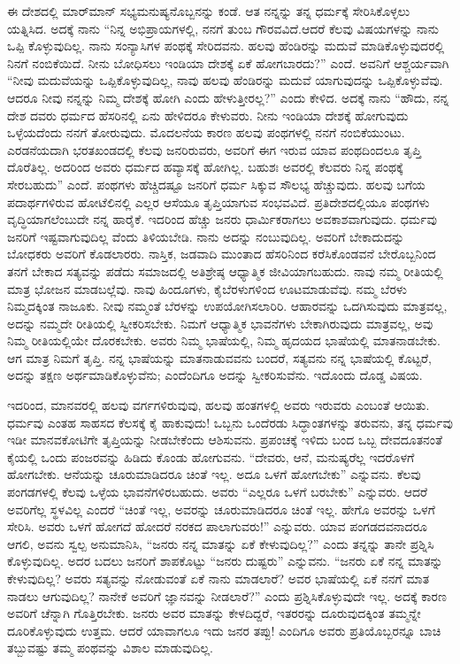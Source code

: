 ಈ ದೇಶದಲ್ಲಿ ಮಾರ್​ಮಾನ್​ ಸಭ್ಯಮನುಷ್ಯನೊಬ್ಬನನ್ನು ಕಂಡೆ. ಆತ ನನ್ನನ್ನು ತನ್ನ ಧರ್ಮಕ್ಕೆ ಸೇರಿಸಿಕೊಳ್ಳಲು ಯತ್ನಿಸಿದ. ಅದಕ್ಕೆ ನಾನು “ನಿನ್ನ ಅಭಿಪ್ರಾಯಗಳಲ್ಲಿ, ನನಗೆ ತುಂಬ ಗೌರವವಿದೆ.ಆದರೆ ಕೆಲವು ವಿಷಯಗಳನ್ನು ನಾನು ಒಪ್ಪಿ ಕೊಳ್ಳುವುದಿಲ್ಲ. ನಾನು ಸಂನ್ಯಾಸಿಗಳ ಪಂಥಕ್ಕೆ ಸೇರಿದವನು. ಹಲವು ಹೆಂಡಿರನ್ನು ಮದುವೆ ಮಾಡಿಕೊಳ್ಳುವುದರಲ್ಲಿ ನಿನಗೆ ನಂಬಿಕೆಯಿದೆ. ನೀನು ಬೋಧಿಸಲು ಇಂಡಿಯಾ ದೇಶಕ್ಕೆ ಏಕೆ ಹೋಗಬಾರದು?” ಎಂದೆ. ಅವನಿಗೆ ಆಶ್ಚರ್ಯವಾಗಿ “ನೀವು ಮದುವೆಯನ್ನು ಒಪ್ಪಿಕೊಳ್ಳುವುದಿಲ್ಲ, ನಾವು ಹಲವು ಹೆಂಡಿರನ್ನು ಮದುವೆ ಯಾಗುವುದನ್ನು ಒಪ್ಪಿಕೊಳ್ಳುವೆವು. ಆದರೂ ನೀವು ನನ್ನನ್ನು ನಿಮ್ಮ ದೇಶಕ್ಕೆ ಹೋಗಿ ಎಂದು ಹೇಳುತ್ತೀರಲ್ಲ?” ಎಂದು ಕೇಳಿದ. ಅದಕ್ಕೆ ನಾನು “ಹೌದು, ನನ್ನ ದೇಶ ದವರು ಧರ್ಮದ ಹೆಸರಿನಲ್ಲಿ ಏನು ಹೇಳಿದರೂ ಕೇಳುವರು. ನೀನು ಇಂಡಿಯಾ ದೇಶಕ್ಕೆ ಹೋಗುವುದು ಒಳ್ಳೆಯದೆಂದು ನನಗೆ ತೋರುವುದು. ಮೊದಲನೆಯ ಕಾರಣ ಹಲವು ಪಂಥಗಳಲ್ಲಿ ನನಗೆ ನಂಬಿಕೆಯುಂಟು. ಎರಡನೆಯದಾಗಿ ಭರತಖಂಡದಲ್ಲಿ ಕೆಲವು ಜನರಿರುವರು, ಅವರಿಗೆ ಈಗ ಇರುವ ಯಾವ ಪಂಥದಿಂದಲೂ ತೃಪ್ತಿ ದೊರೆತಿಲ್ಲ. ಅದರಿಂದ ಅವರು ಧರ್ಮದ ಹವ್ಯಾಸಕ್ಕೆ ಹೋಗಿಲ್ಲ. ಬಹುಶಃ ಅವರಲ್ಲಿ ಕೆಲವರು ನಿನ್ನ ಪಂಥಕ್ಕೆ ಸೇರಬಹುದು” ಎಂದೆ. ಪಂಥಗಳು ಹೆಚ್ಚಿದಷ್ಟೂ ಜನರಿಗೆ ಧರ್ಮ ಸಿಕ್ಕುವ ಸೌಲಭ್ಯ ಹೆಚ್ಚುವುದು. ಹಲವು ಬಗೆಯ ಪದಾರ್ಥಗಳಿರುವ ಹೋಟೆಲಿನಲ್ಲಿ ಎಲ್ಲರ ಆಸೆಯೂ ತೃಪ್ತಿಯಾಗುವ ಸಂಭವವಿದೆ. ಪ್ರತಿದೇಶದಲ್ಲಿಯೂ ಪಂಥಗಳು ವೃದ್ಧಿಯಾಗಲೆಂಬುದೇ ನನ್ನ ಹಾರೈಕೆ. ಇದರಿಂದ ಹೆಚ್ಚು ಜನರು ಧಾರ್ಮಿಕರಾಗಲು ಅವಕಾಶವಾಗುವುದು. ಧರ್ಮವು ಜನರಿಗೆ ಇಷ್ಟವಾಗುವುದಿಲ್ಲ ವೆಂದು ತಿಳಿಯಬೇಡಿ. ನಾನು ಅದನ್ನು ನಂಬುವುದಿಲ್ಲ. ಅವರಿಗೆ ಬೇಕಾದುದನ್ನು ಬೋಧಕರು ಅವರಿಗೆ ಕೊಡಲಾರರು. ನಾಸ್ತಿಕ, ಜಡವಾದಿ ಮುಂತಾದ ಹೆಸರಿನಿಂದ ಕರೆಸಿಕೊಂಡವನೆ ಬೇರೊಬ್ಬನಿಂದ ತನಗೆ ಬೇಕಾದ ಸತ್ಯವನ್ನು ಪಡೆದು ಸಮಾಜದಲ್ಲಿ ಅತಿಶ್ರೇಷ್ಠ ಆಧ್ಯಾತ್ಮಿಕ ಜೀವಿಯಾಗಬಹುದು. ನಾವು ನಮ್ಮ ರೀತಿಯಲ್ಲಿ ಮಾತ್ರ ಭೋಜನ ಮಾಡಬಲ್ಲೆವು. ನಾವು ಹಿಂದೂಗಳು, ಕೈಬೆರಳುಗಳಿಂದ ಊಟಮಾಡುವೆವು. ನಮ್ಮ ಬೆರಳು ನಿಮ್ಮದಕ್ಕಿಂತ ನಾಜೂಕು. ನೀವು ನಮ್ಮಂತೆ ಬೆರಳನ್ನು ಉಪಯೋಗಿಸಲಾರಿರಿ. ಆಹಾರವನ್ನು ಒದಗಿಸುವುದು ಮಾತ್ರವಲ್ಲ, ಅದನ್ನು ನಮ್ಮದೇ ರೀತಿಯಲ್ಲಿ ಸ್ವೀಕರಿಸಬೇಕು. ನಿಮಗೆ ಆಧ್ಯಾತ್ಮಿಕ ಭಾವನೆಗಳು ಬೇಕಾಗಿರುವುದು ಮಾತ್ರವಲ್ಲ, ಅವು ನಿಮ್ಮ ರೀತಿಯಲ್ಲಿಯೇ ದೊರಕಬೇಕು. ಅವರು ನಿಮ್ಮ ಭಾಷೆಯಲ್ಲಿ, ನಿಮ್ಮ ಹೃದಯದ ಭಾಷೆಯಲ್ಲಿ ಮಾತನಾಡಬೇಕು. ಆಗ ಮಾತ್ರ ನಿಮಗೆ ತೃಪ್ತಿ. ನನ್ನ ಭಾಷೆಯನ್ನು ಮಾತನಾಡುವವನು ಬಂದರೆ, ಸತ್ಯವನು ನನ್ನ ಭಾಷೆಯಲ್ಲಿ ಕೊಟ್ಟರೆ, ಅದನ್ನು ತಕ್ಷಣ ಅರ್ಥಮಾಡಿಕೊಳ್ಳುವೆನು; ಎಂದೆಂದಿಗೂ ಅದನ್ನು ಸ್ವೀಕರಿಸುವೆನು. ಇದೊಂದು ದೊಡ್ಡ ವಿಷಯ.

ಇದರಿಂದ, ಮಾನವರಲ್ಲಿ ಹಲವು ವರ್ಗಗಳಿರುವುವು, ಹಲವು ಹಂತಗಳಲ್ಲಿ ಅವರು ಇರುವರು ಎಂಬಂತೆ ಆಯಿತು. ಧರ್ಮವು ಎಂತಹ ಸಾಹಸದ ಕೆಲಸಕ್ಕೆ ಕೈ ಹಾಕುವುದು! ಒಬ್ಬನು ಒಂದೆರಡು ಸಿದ್ಧಾಂತಗಳನ್ನು ತರುವನು, ತನ್ನ ಧರ್ಮವು ಇಡೀ ಮಾನವಕೋಟಿಗೇ ತೃಪ್ತಿಯನ್ನು ನೀಡಬೇಕೆಂದು ಆಶಿಸುವನು. ಪ್ರಪಂಚಕ್ಕೆ ಇಳಿದು ಬಂದ ಒಬ್ಬ ದೇವದೂತನಂತೆ ಕೈಯಲ್ಲಿ ಒಂದು ಪಂಜರವನ್ನು ಹಿಡಿದು ಕೊಂಡು ಹೋಗುವನು. “ದೇವರು, ಆನೆ, ಮನುಷ್ಯರೆಲ್ಲ ಇದರೊಳಗೆ ಹೋಗಬೇಕು. ಆನೆಯನ್ನು ಚೂರುಮಾಡಿದರೂ ಚಿಂತೆ ಇಲ್ಲ. ಅದೂ ಒಳಗೆ ಹೋಗಬೇಕು” ಎನ್ನುವನು. ಕೆಲವು ಪಂಗಡಗಳಲ್ಲಿ ಕೆಲವು ಒಳ್ಳೆಯ ಭಾವನೆಗಳಿರಬಹುದು. ಅವರು “ಎಲ್ಲರೂ ಒಳಗೆ ಬರಬೇಕು” ಎನ್ನುವರು. ಆದರೆ ಅವರಿಗೆಲ್ಲ ಸ್ಥಳವಿಲ್ಲ ಎಂದರೆ “ಚಿಂತೆ ಇಲ್ಲ, ಅವರನ್ನು ಚೂರುಮಾಡಿದರೂ ಚಿಂತೆ ಇಲ್ಲ. ಹೇಗೊ ಅವರನ್ನು ಒಳಗೆ ಸೇರಿಸಿ. ಅವರು ಒಳಗೆ ಹೋಗದೆ ಹೋದರೆ ನರಕದ ಪಾಲಾಗುವರು!” ಎನ್ನುವರು. ಯಾವ ಪಂಗಡದವನಾದರೂ ಆಗಲಿ, ಅವನು ಸ್ವಲ್ಪ ಅನುಮಾನಿಸಿ, “ಜನರು ನನ್ನ ಮಾತನ್ನು ಏಕೆ ಕೇಳುವುದಿಲ್ಲ?” ಎಂದು ತನ್ನನ್ನು ತಾನೇ ಪ್ರಶ್ನಿಸಿ ಕೊಳ್ಳುವುದಿಲ್ಲ. ಅದರ ಬದಲು ಜನರಿಗೆ ಶಾಪಕೊಟ್ಟು “ಜನರು ದುಷ್ಟರು” ಎನ್ನುವನು. “ಜನರು ಏಕೆ ನನ್ನ ಮಾತನ್ನು ಕೇಳುವುದಿಲ್ಲ? ಅವರು ಸತ್ಯವನ್ನು ನೋಡುವಂತೆ ಏಕೆ ನಾನು ಮಾಡಲಾರೆ? ಅವರ ಭಾಷೆಯಲ್ಲಿ ಏಕೆ ನನಗೆ ಮಾತ ನಾಡಲು ಆಗುವುದಿಲ್ಲ? ನಾನೇಕೆ ಅವರಿಗೆ ಜ್ಞಾನವನ್ನು ನೀಡಲಾರೆ?” ಎಂದು ಪ್ರಶ್ನಿಸಿಕೊಳ್ಳುವುದೇ ಇಲ್ಲ. ಅದಕ್ಕೆ ಕಾರಣ ಅವರಿಗೆ ಚೆನ್ನಾಗಿ ಗೊತ್ತಿರಬೇಕು. ಜನರು ಅವರ ಮಾತನ್ನು ಕೇಳದಿದ್ದರೆ, ಇತರರನ್ನು ದೂರುವುದಕ್ಕಿಂತ ತಮ್ಮನ್ನೇ ದೂರಿಕೊಳ್ಳುವುದು ಉತ್ತಮ. ಆದರೆ ಯಾವಾಗಲೂ ಇದು ಜನರ ತಪ್ಪು! ಎಂದಿಗೂ ಅವರು ಪ್ರತಿಯೊಬ್ಬರನ್ನೂ ಬಾಚಿ ತಬ್ಬುವಷ್ಟು ತಮ್ಮ ಪಂಥವನ್ನು ವಿಶಾಲ ಮಾಡುವುದಿಲ್ಲ.

